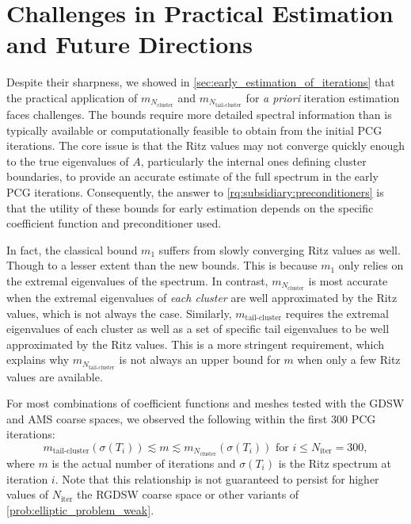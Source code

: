 \section{Challenges in Practical Estimation and Future Directions}
Despite their sharpness, we showed in \cref{sec:early_estimation_of_iterations} that the practical application of $m_{N_{\text{cluster}}}$ and $m_{N_{\text{tail-cluster}}}$ for \textit{a priori} iteration estimation faces challenges. The bounds require more detailed spectral information than is typically available or computationally feasible to obtain from the initial PCG iterations. The core issue is that the Ritz values may not converge quickly enough to the true eigenvalues of $A$, particularly the internal ones defining cluster boundaries, to provide an accurate estimate of the full spectrum in the early PCG iterations. Consequently, the answer to \ref{rq:subsidiary:preconditioners} is that the utility of these bounds for early estimation depends on the specific coefficient function and preconditioner used.

In fact, the classical bound $m_1$ suffers from slowly converging Ritz values as well. Though to a lesser extent than the new bounds. This is because $m_1$ only relies on the extremal eigenvalues of the spectrum. In contrast, $m_{N_{\text{cluster}}}$ is most accurate when the extremal eigenvalues of \textit{each cluster} are well approximated by the Ritz values, which is not always the case. Similarly, $m_{\text{tail-cluster}}$ requires the extremal eigenvalues of each cluster as well as a set of specific tail eigenvalues to be well approximated by the Ritz values. This is a more stringent requirement, which explains why $m_{N_{\text{tail-cluster}}}$ is not always an upper bound for $m$ when only a few Ritz values are available.

For most combinations of coefficient functions and meshes tested with the GDSW and AMS coarse spaces, we observed the following within the first 300 PCG iterations:
\begin{equation}
    m_{\text{tail-cluster}}(\sigma(T_i)) \lesssim m \lesssim m_{N_{\text{cluster}}}(\sigma(T_i)) \text{ for } i \leq N_{\text{iter}} = 300,
    \label{eq:heuristic_observation}
\end{equation}
where $m$ is the actual number of iterations and $\sigma(T_i)$ is the Ritz spectrum at iteration $i$. Note that this relationship is not guaranteed to persist for higher values of $N_{\text{iter}}$ the RGDSW coarse space or other variants of \cref{prob:elliptic_problem_weak}.

